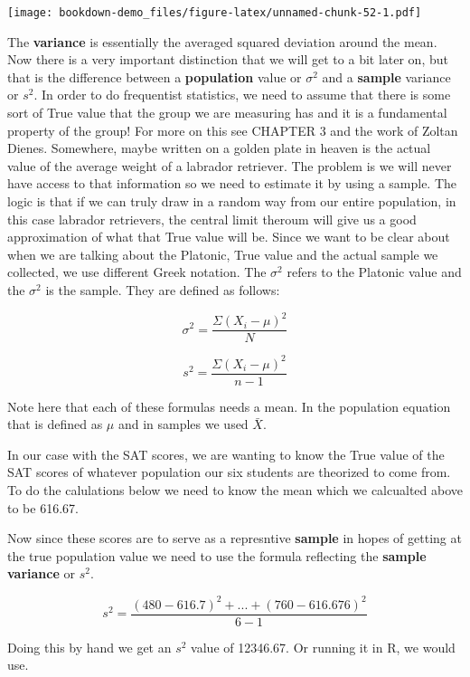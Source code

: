 \documentclass[]{book}
\newenvironment{Shaded}{\begin{snugshade}}{\end{snugshade}}
\newcommand{\KeywordTok}[1]{\textcolor[rgb]{0.13,0.29,0.53}{\textbf{#1}}}
\newcommand{\OperatorTok}[1]{\textcolor[rgb]{0.81,0.36,0.00}{\textbf{#1}}}
\newcommand{\NormalTok}[1]{#1}
\theoremstyle{definition}
\theoremstyle{definition}
\theoremstyle{definition}
\theoremstyle{remark}
\begin{document}
\texttt{[image: bookdown-demo\_files/figure-latex/unnamed-chunk-52-1.pdf]}

The \textbf{variance} is essentially the averaged squared deviation
around the mean. Now there is a very important distinction that we will
get to a bit later on, but that is the difference between a
\textbf{population} value or \(\sigma^2\) and a \textbf{sample} variance
or \(s^2\). In order to do frequentist statistics, we need to assume
that there is some sort of True value that the group we are measuring
has and it is a fundamental property of the group! For more on this see
CHAPTER 3 and the work of Zoltan Dienes. Somewhere, maybe written on a
golden plate in heaven is the actual value of the average weight of a
labrador retriever. The problem is we will never have access to that
information so we need to estimate it by using a sample. The logic is
that if we can truly draw in a random way from our entire population, in
this case labrador retrievers, the central limit theroum will give us a
good approximation of what that True value will be. Since we want to be
clear about when we are talking about the Platonic, True value and the
actual sample we collected, we use different Greek notation. The
\(\sigma^2\) refers to the Platonic value and the \(\sigma^2\) is the
sample. They are defined as follows:

\[\sigma^2 = \frac{\Sigma(X_i - \mu)^2}{N}\]

\[s^2 = \frac{\Sigma(X_i - \mu)^2}{n-1}\]

Note here that each of these formulas needs a mean. In the population
equation that is defined as \(\mu\) and in samples we used \(\bar{X}\).

In our case with the SAT scores, we are wanting to know the True value
of the SAT scores of whatever population our six students are theorized
to come from. To do the calulations below we need to know the mean which
we calcualted above to be 616.67.

Now since these scores are to serve as a represntive \textbf{sample} in
hopes of getting at the true population value we need to use the formula
reflecting the \textbf{sample variance} or \(s^2\).

\[s^2 = \frac{(480-616.7)^2 + . . . + (760 - 616.676)^2}{6-1}\]

Doing this by hand we get an \(s^2\) value of 12346.67. Or running it in
R, we would use.

\begin{Shaded}
\end{Shaded}
\end{document}

